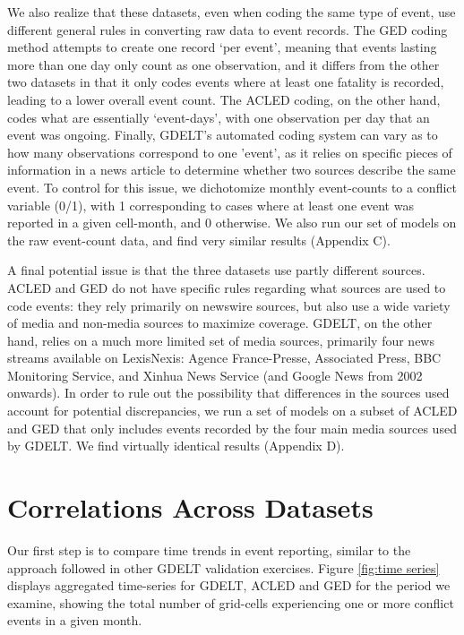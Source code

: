 \documentclass[hidelinks]{article}
\begin{document}
We also realize that these datasets, even when coding the same type of event, use different general rules in converting raw data to event records. The GED coding method attempts to create one record `per event', meaning that events lasting more than one day only count as one observation, and it differs from the other two datasets in that it only codes events where at least one fatality is recorded, leading to a lower overall event count. The ACLED coding, on the other hand, codes what are essentially `event-days', with one observation per day that an event was ongoing. Finally, GDELT's automated coding system can vary as to how many observations correspond to one 'event', as it relies on specific pieces of information in a news article to determine whether two sources describe the same event. To control for this issue, we dichotomize monthly event-counts to a conflict variable (0/1), with 1 corresponding to cases where at least one event was reported in a given cell-month, and 0 otherwise. We also run our set of models on the raw event-count data, and find very similar results (Appendix C).

A final potential issue is that the three datasets use partly different sources. ACLED and GED do not have specific rules regarding what sources are used to code events: they rely primarily on newswire sources, but also use a wide variety of media and non-media sources to maximize coverage. GDELT, on the other hand, relies on a much more limited set of media sources, primarily four news streams available on LexisNexis: Agence France-Presse, Associated Press, BBC Monitoring Service, and Xinhua News Service (and Google News from 2002 onwards). In order to rule out the possibility that differences in the sources used account for potential discrepancies, we run a set of models on a subset of ACLED and GED that only includes events recorded by the four main media sources used by GDELT. We find virtually identical results (Appendix D).

\section*{Correlations Across Datasets}

Our first step is to compare time trends in event reporting, similar to the approach followed in other GDELT validation exercises. Figure \ref{fig:time series} displays aggregated time-series for GDELT, ACLED and GED for the period we examine, showing the total number of grid-cells experiencing one or more conflict events in a given month.
\end{document}
